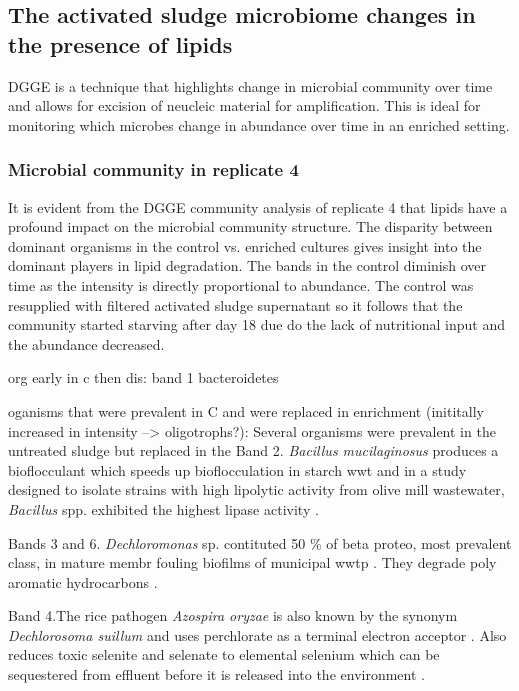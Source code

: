 \documentclass[11pt]{article}
\begin{document}
\subsection{The activated sludge microbiome changes in the presence of lipids}
DGGE is a technique that highlights change in microbial community over time and allows for excision of neucleic material for amplification. This is ideal for monitoring which microbes change in abundance over time in an enriched setting.

 \subsubsection{Microbial community in replicate 4}
It is evident from the DGGE community analysis of replicate 4 that lipids have a profound impact on the microbial community structure. The disparity between dominant organisms in the control vs. enriched cultures gives insight into the dominant players in lipid degradation. The bands in the control diminish over time as the intensity is directly proportional to abundance. The control was resupplied with filtered activated sludge supernatant so it follows that the community started starving after day 18 due do the lack of nutritional input and the abundance decreased.

org early in c then dis:
band 1 bacteroidetes

oganisms that were prevalent in C and were replaced in enrichment (inititally increased in intensity --> oligotrophs?):
Several organisms were prevalent in the untreated sludge but replaced in the 
Band 2. \emph{Bacillus mucilaginosus} produces a bioflocculant which speeds up bioflocculation in starch wwt \cite{deng2003characteristics} and in a study designed to isolate strains with high lipolytic activity from olive mill wastewater, \emph{Bacillus} spp. exhibited the highest lipase activity \cite{ertuugrul2007isolation}.

Bands 3 and 6. \emph{Dechloromonas} sp. contituted 50 \% of beta proteo, most prevalent class,  in mature membr fouling biofilms of municipal wwtp \cite{miura2007membrane}. They degrade poly aromatic hydrocarbons \cite{oshiki2008pha}.

Band 4.The rice pathogen \emph{Azospira oryzae} is also known by the synonym \emph{Dechlorosoma suillum} and uses perchlorate as a terminal electron acceptor  \cite{reinhold2000reassessment,tan2003dechlorosoma}. Also reduces toxic selenite and selenate to elemental selenium which can be sequestered from effluent before it is released into the environment \cite{hunter2007azospira,wilhelmus2013microbiological}.
\end{document}
